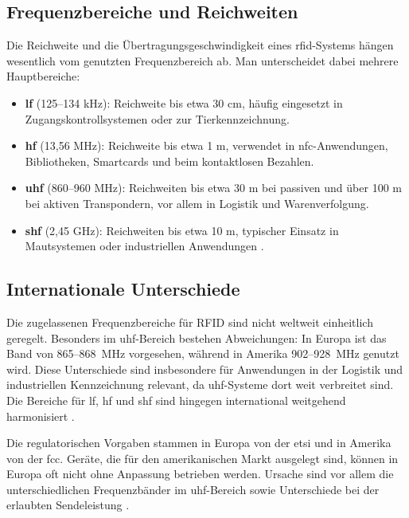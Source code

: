 \subsection{Frequenzbereiche und Reichweiten}

Die Reichweite und die Übertragungsgeschwindigkeit eines \ac{rfid}-Systems hängen wesentlich vom genutzten Frequenzbereich ab. 
Man unterscheidet dabei mehrere Hauptbereiche:

\begin{itemize}
	\item \textbf{\ac{lf}} (125–134 kHz): Reichweite bis etwa 30 cm, häufig eingesetzt in Zugangskontrollsystemen oder zur Tierkennzeichnung. 
	\item \textbf{\ac{hf}} (13,56 MHz): Reichweite bis etwa 1 m, verwendet in \ac{nfc}-Anwendungen, Bibliotheken, Smartcards und beim kontaktlosen Bezahlen. 
	\item \textbf{\ac{uhf}} (860–960 MHz): Reichweiten bis etwa 30 m bei passiven und über 100 m bei aktiven Transpondern, vor allem in Logistik und Warenverfolgung.
	\item \textbf{\ac{shf}} (2,45 GHz): Reichweiten bis etwa 10 m, typischer Einsatz in Mautsystemen oder industriellen Anwendungen \cite{Heuermann:2023,Conrad:2024a}. 
\end{itemize}

\subsection{Internationale Unterschiede}

Die zugelassenen Frequenzbereiche für RFID sind nicht weltweit einheitlich geregelt. 
Besonders im \ac{uhf}-Bereich bestehen Abweichungen: 
In Europa ist das Band von 865–868~MHz vorgesehen, während in Amerika 902–928~MHz genutzt wird. 
Diese Unterschiede sind insbesondere für Anwendungen in der Logistik und industriellen Kennzeichnung relevant, da \ac{uhf}-Systeme dort weit verbreitet sind. 
Die Bereiche für \ac{lf}, \ac{hf} und \ac{shf}  sind hingegen international weitgehend harmonisiert \cite{finkenzeller:2019}.  

Die regulatorischen Vorgaben stammen in Europa von der \ac{etsi} und in Amerika von der \ac{fcc}. 
Geräte, die für den amerikanischen Markt ausgelegt sind, können in Europa oft nicht ohne Anpassung betrieben werden. 
Ursache sind vor allem die unterschiedlichen Frequenzbänder im \ac{uhf}-Bereich sowie Unterschiede bei der erlaubten Sendeleistung \cite{finkenzeller:2019}.  

